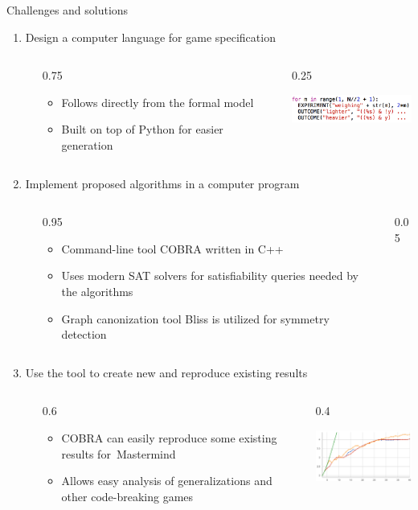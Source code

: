 \documentclass[final]{beamer}
\newcommand{\thando}[4]{
\begin{columns}[T]
\begin{column}{\leftmarginii}
\end{column}
\begin{column}{#3\textwidth}
\vspace{-1.5mm}
\begin{itemize}
#1
\end{itemize}
\end{column}
\begin{column}{#4\textwidth}
#2
\end{column}
\end{columns}\medskip}
\begin{document}
\begin{frame}{}
\begin{columns}[t]
\begin{column}{.48\linewidth}
\begin{block}{Challenges and solutions}
\begin{enumerate}
{        }{0.65}{0.35}
      \item Design a computer language for game specification
        \thando{
        \item Follows directly from the formal model
        \item Built on top of Python for easier generation
        }{
          \hspace{-22mm}
          \includegraphics[width=4cm]{img-language.png}
        }{0.75}{0.25}
      \item Implement proposed algorithms in a computer program
        \thando{
        \item Command-line tool COBRA written in C++
        \item Uses modern SAT solvers for satisfiability queries needed by the algorithms
        \item Graph canonization tool Bliss is utilized for symmetry detection
        }{

        }{0.95}{0.05}
      \item Use the tool to create new and reproduce existing results
        \thando{
        \item COBRA can easily reproduce some existing results for~Mastermind
        \item Allows easy analysis of generalizations and other code-breaking games
        }{
          \hspace{-5mm}
          \includegraphics[width=4.5cm]{img-results.png}
        }{0.6}{0.4}
      \end{enumerate}
    \end{block}       
  \end{column}
\end{columns}
\vfill
\end{frame}
\end{document}
